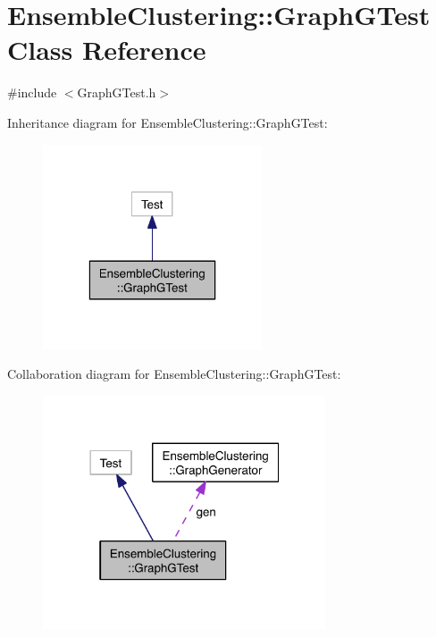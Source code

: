 \hypertarget{class_ensemble_clustering_1_1_graph_g_test}{\section{Ensemble\-Clustering\-:\-:Graph\-G\-Test Class Reference}
\label{class_ensemble_clustering_1_1_graph_g_test}
}


{\ttfamily \#include $<$Graph\-G\-Test.\-h$>$}



Inheritance diagram for Ensemble\-Clustering\-:\-:Graph\-G\-Test\-:\nopagebreak
\begin{figure}[H]
\begin{center}
\leavevmode
\includegraphics[width=184pt]{class_ensemble_clustering_1_1_graph_g_test__inherit__graph}
\end{center}
\end{figure}


Collaboration diagram for Ensemble\-Clustering\-:\-:Graph\-G\-Test\-:\nopagebreak
\begin{figure}[H]
\begin{center}
\leavevmode
\includegraphics[width=237pt]{class_ensemble_clustering_1_1_graph_g_test__coll__graph}
\end{center}
\end{figure}
